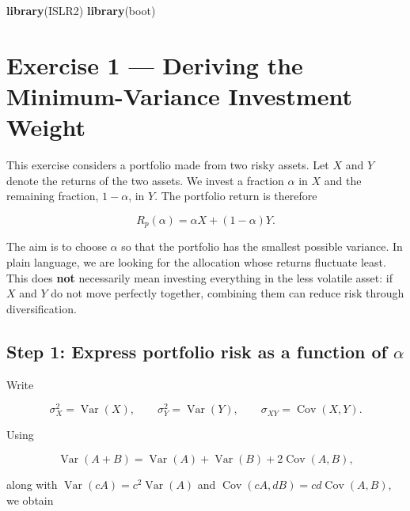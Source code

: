 \documentclass[
  11pt,
]{article}
\author{}
\date{\vspace{-2.5em}}
\newenvironment{Shaded}{\begin{snugshade}}{\end{snugshade}}
\newcommand{\FunctionTok}[1]{\textcolor[rgb]{0.13,0.29,0.53}{\textbf{#1}}}
\newcommand{\NormalTok}[1]{#1}
\begin{document}

\begin{Shaded}
\begin{Highlighting}[]
\FunctionTok{library}\NormalTok{(ISLR2)}
\FunctionTok{library}\NormalTok{(boot)}
\end{Highlighting}
\end{Shaded}

\section{Exercise 1 --- Deriving the Minimum-Variance Investment
Weight}\label{exercise-1-deriving-the-minimum-variance-investment-weight}

This exercise considers a portfolio made from two risky assets. Let
\(X\) and \(Y\) denote the returns of the two assets. We invest a
fraction \(\alpha\) in \(X\) and the remaining fraction, \(1-\alpha\),
in \(Y\). The portfolio return is therefore

\[
R_p(\alpha) = \alpha X + (1-\alpha)Y.
\]

The aim is to choose \(\alpha\) so that the portfolio has the smallest
possible variance. In plain language, we are looking for the allocation
whose returns fluctuate least. This does \textbf{not} necessarily mean
investing everything in the less volatile asset: if \(X\) and \(Y\) do
not move perfectly together, combining them can reduce risk through
diversification.

\subsection{\texorpdfstring{Step 1: Express portfolio risk as a function
of
\(\alpha\)}{Step 1: Express portfolio risk as a function of \textbackslash alpha}}\label{step-1-express-portfolio-risk-as-a-function-of-alpha}

Write

\[
\sigma_X^2 = \operatorname{Var}(X), \qquad
\sigma_Y^2 = \operatorname{Var}(Y), \qquad
\sigma_{XY} = \operatorname{Cov}(X,Y).
\]

Using

\[
\operatorname{Var}(A+B) = \operatorname{Var}(A) + \operatorname{Var}(B)
  + 2\operatorname{Cov}(A,B),
\]

along with \(\operatorname{Var}(cA)=c^2\operatorname{Var}(A)\) and
\(\operatorname{Cov}(cA,dB)=cd\operatorname{Cov}(A,B)\), we obtain
\end{document}
